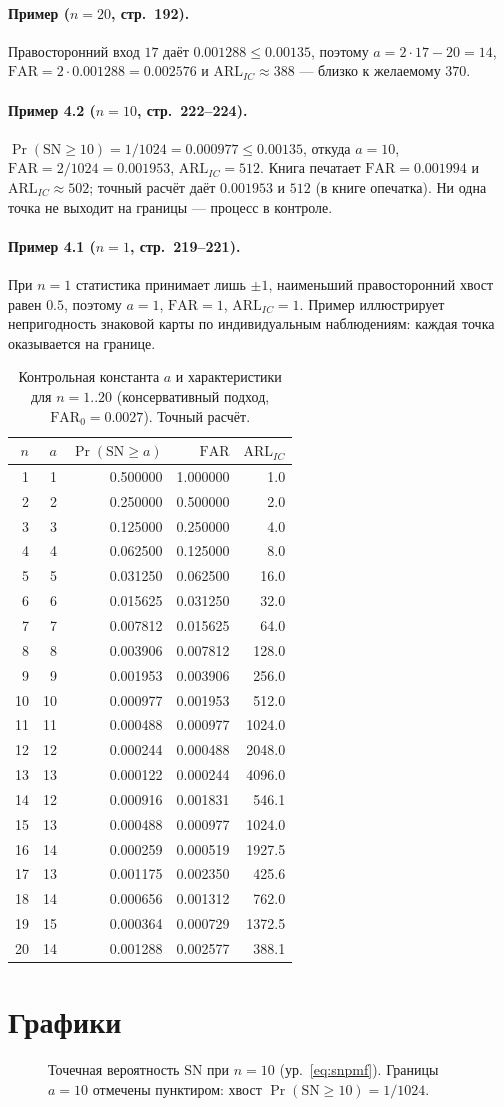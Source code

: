 \documentclass[11pt,a4paper]{article}
\newcommand{\SN}{\mathrm{SN}}
\newcommand{\FAR}{\mathrm{FAR}}
\newcommand{\ARL}{\mathrm{ARL}}
\newcommand{\FARz}{\FAR_0}
\def\snpmfnTen{(-10,0.0009766) (-8,0.0097656) (-6,0.0439453) (-4,0.1171875) (-2,0.2050781) (0,0.2460938) (2,0.2050781) (4,0.1171875) (6,0.0439453) (8,0.0097656) (10,0.0009766)}
\def\snTable{%
1 & 1 & 0.500000 & 1.000000 & 1.0\\
2 & 2 & 0.250000 & 0.500000 & 2.0\\
3 & 3 & 0.125000 & 0.250000 & 4.0\\
4 & 4 & 0.062500 & 0.125000 & 8.0\\
5 & 5 & 0.031250 & 0.062500 & 16.0\\
6 & 6 & 0.015625 & 0.031250 & 32.0\\
7 & 7 & 0.007812 & 0.015625 & 64.0\\
8 & 8 & 0.003906 & 0.007812 & 128.0\\
9 & 9 & 0.001953 & 0.003906 & 256.0\\
10 & 10 & 0.000977 & 0.001953 & 512.0\\
11 & 11 & 0.000488 & 0.000977 & 1024.0\\
12 & 12 & 0.000244 & 0.000488 & 2048.0\\
13 & 13 & 0.000122 & 0.000244 & 4096.0\\
14 & 12 & 0.000916 & 0.001831 & 546.1\\
15 & 13 & 0.000488 & 0.000977 & 1024.0\\
16 & 14 & 0.000259 & 0.000519 & 1927.5\\
17 & 13 & 0.001175 & 0.002350 & 425.6\\
18 & 14 & 0.000656 & 0.001312 & 762.0\\
19 & 15 & 0.000364 & 0.000729 & 1372.5\\
20 & 14 & 0.001288 & 0.002577 & 388.1\\}
\begin{document}
\paragraph{Пример ($n=20$, стр.~192).}
Правосторонний вход $17$ даёт $0.001288\le 0.00135$, поэтому
$a=2\cdot17-20=14$, $\FAR=2\cdot0.001288=0.002576$ и
$\ARL_{IC}\approx 388$ --- близко к желаемому $370$.

\paragraph{Пример 4.2 ($n=10$, стр.~222--224).}
$\Pr(\SN\ge 10)=1/1024=0.000977\le 0.00135$, откуда $a=10$,
$\FAR=2/1024=0.001953$, $\ARL_{IC}=512$. Книга печатает
$\FAR=0.001994$ и $\ARL_{IC}\approx 502$; точный расчёт даёт
$0.001953$ и $512$ (в книге опечатка). Ни одна точка не выходит на
границы --- процесс в контроле.

\paragraph{Пример 4.1 ($n=1$, стр.~219--221).}
При $n=1$ статистика принимает лишь $\pm1$, наименьший правосторонний
хвост равен $0.5$, поэтому $a=1$, $\FAR=1$, $\ARL_{IC}=1$. Пример
иллюстрирует непригодность знаковой карты по индивидуальным наблюдениям:
каждая точка оказывается на границе.

\begin{table}[htbp]\centering
\caption{Контрольная константа $a$ и характеристики для $n=1..20$
(консервативный подход, $\FARz=0.0027$). Точный расчёт.}
\label{tab:sntable}
\begin{tabular}{rrrrr}
\toprule
$n$ & $a$ & $\Pr(\SN\ge a)$ & $\FAR$ & $\ARL_{IC}$\\
\midrule
\snTable
\bottomrule
\end{tabular}
\end{table}

\section{Графики}

\begin{figure}[htbp]\centering
{}
\caption{Точечная вероятность $\SN$ при $n=10$ (ур.~\eqref{eq:snpmf}).
Границы $a=10$ отмечены пунктиром: хвост $\Pr(\SN\ge 10)=1/1024$.}
\label{fig:snpmf}
\end{figure}
\end{document}
